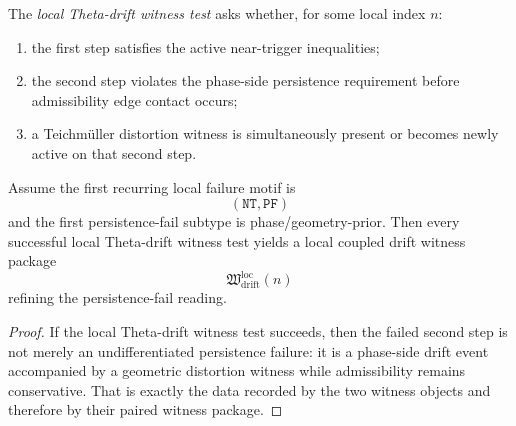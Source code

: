 \begin{definition}
\label{def:local-theta-drift-witness-test}
The \emph{local Theta-drift witness test} asks whether, for some local index \(n\):
\begin{enumerate}
    \item the first step satisfies the active near-trigger inequalities;
    \item the second step violates the phase-side persistence requirement before admissibility edge contact occurs;
    \item a Teichm\"uller distortion witness is simultaneously present or becomes newly active on that second step.
\end{enumerate}
\end{definition}

\begin{proposition}
\label{prop:theta-drift-witness-packages-refine-default-persistence-fail-reading}
Assume the first recurring local failure motif is
\[
(\mathtt{NT},\mathtt{PF})
\]
and the first persistence-fail subtype is phase/geometry-prior.
Then every successful local Theta-drift witness test yields a local coupled drift witness package
\[
\mathfrak{W}_{\mathrm{drift}}^{\mathrm{loc}}(n)
\]
refining the persistence-fail reading.
\end{proposition}

\begin{proof}
If the local Theta-drift witness test succeeds, then the failed second step is not merely an undifferentiated persistence failure: it is a phase-side drift event accompanied by a geometric distortion witness while admissibility remains conservative.
That is exactly the data recorded by the two witness objects and therefore by their paired witness package.
\end{proof}

